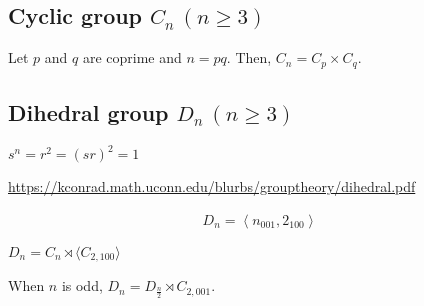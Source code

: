 \subsection{Cyclic group \texorpdfstring{$C_{n} \, (n \geq 3)$}{Cn (n >= 3)}}

Let $p$ and $q$ are coprime and $n = pq$.
Then, $C_{n} = C_{p} \times C_{q}$.

\subsection{Dihedral group \texorpdfstring{$D_{n} \, (n \geq 3)$}{Dn (n >= 3)}}

$s^{n} = r^{2} = (sr)^{2} = 1$

\url{https://kconrad.math.uconn.edu/blurbs/grouptheory/dihedral.pdf}

\begin{align}
    D_{n} = \left\langle n_{001}, 2_{100} \right\rangle
\end{align}

$D_{n} = C_{n} \rtimes \langle C_{2, 100} \rangle$

When $n$ is odd, $D_{n} = D_{\frac{n}{2}} \rtimes C_{2, 001}$.
